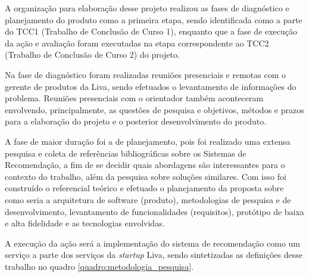 A organização para elaboração desse projeto realizou as fases de diagnóstico e planejamento do produto como a primeira etapa, sendo identificada como a parte do TCC1 (Trabalho de Conclusão de Curso 1), enquanto que a fase de execução da ação e avaliação foram executadas na etapa correspondente ao TCC2 (Trabalho de Conclusão de Curso 2) do projeto.

Na fase de diagnóstico foram realizadas reuniões presenciais e remotas com o gerente de produtos da Liva, sendo efetuados o levantamento de informações do problema. Reuniões presenciais com o orientador também aconteceram envolvendo, principalmente, as questões de pesquisa e objetivos, métodos e prazos para a elaboração do projeto e o posterior desenvolvimento do produto.

A fase de maior duração foi a de planejamento, pois foi realizado uma extensa pesquisa e coleta de referências bibliográficas sobre os Sistemas de Recomendação, a fim de se decidir quais abordagens são interessantes para o contexto do trabalho, além da pesquisa sobre soluções similares. Com isso foi construído o referencial teórico e efetuado o planejamento da proposta sobre como seria a arquitetura de software (produto), metodologias de pesquisa e de desenvolvimento, levantamento de funcionalidades (requisitos), protótipo de baixa e alta fidelidade e as tecnologias envolvidas.

A execução da ação será a implementação do sistema de recomendação como um serviço a parte dos serviços da \textit{startup} Liva, sendo sintetizadas as definições desse trabalho no quadro \ref{quadro:metodologia_pesquisa}.

